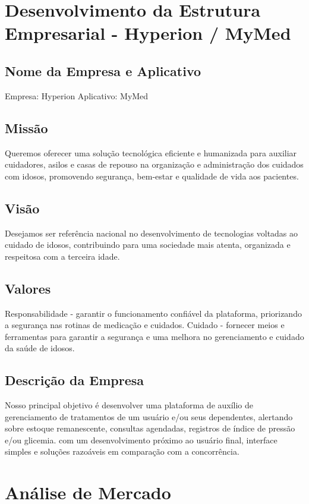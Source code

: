 \section{Desenvolvimento da Estrutura Empresarial - Hyperion / MyMed}

\subsection*{Nome da Empresa e Aplicativo}
Empresa: Hyperion 
Aplicativo: MyMed

\subsection*{Missão}
Queremos oferecer uma solução tecnológica eficiente e humanizada para auxiliar cuidadores, asilos e casas de repouso na organização e administração dos cuidados com idosos, promovendo segurança, bem-estar e qualidade de vida aos pacientes.

\subsection*{Visão}
Desejamos ser referência nacional no desenvolvimento de tecnologias voltadas ao cuidado de idosos, contribuindo para uma sociedade mais atenta, organizada e respeitosa com a terceira idade.  

\subsection*{Valores}
Responsabilidade - garantir o funcionamento confiável da plataforma, priorizando a segurança nas rotinas de medicação e cuidados.  
Cuidado - fornecer meios e ferramentas para garantir a segurança e uma melhora no gerenciamento e cuidado da saúde de idosos. 

\subsection*{Descrição da Empresa}
Nosso principal objetivo é desenvolver uma plataforma de auxílio de gerenciamento de tratamentos de um usuário e/ou seus dependentes, alertando sobre estoque remanescente, consultas agendadas, registros de índice de pressão e/ou glicemia. com um desenvolvimento próximo ao usuário final, interface simples e soluções razoáveis em comparação com a concorrência. 

\section{Análise de Mercado}

